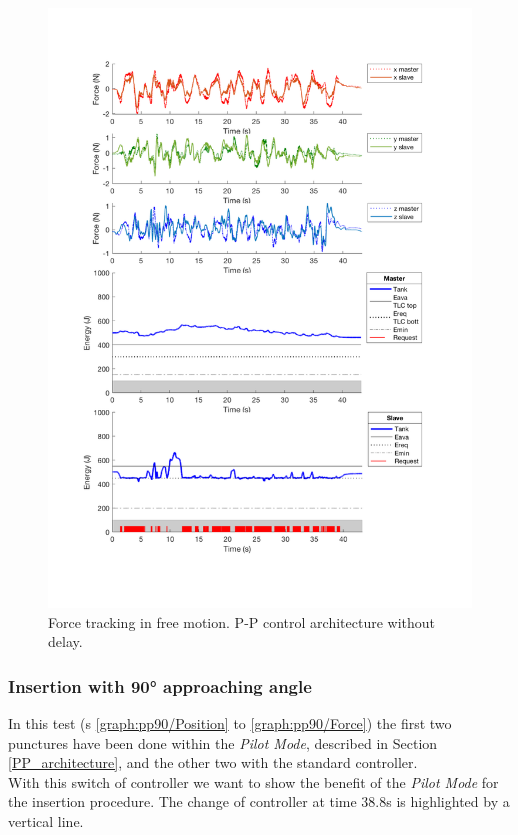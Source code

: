 \begin{center}
	\begin{figure}
	\includegraphics[width=\textwidth, keepaspectratio]{plots/ppFree/Force.pdf}
	\caption{Force tracking in free motion. P-P control architecture without delay.}
	\label{graph:ppFree/Force}
\end{figure}
\end{center}
\newpage
\subsubsection{Insertion with 90° approaching angle}\label{sec:insertion-with-90-approaching-angle1}
In this test  (\figurename s{ \ref{graph:pp90/Position} to \ref{graph:pp90/Force}}) the first two punctures have been done within the \textit{Pilot Mode}, described in Section \ref{PP_architecture}, and the other two with the standard controller.\\
With this switch of controller we want to show the benefit of the \textit{Pilot Mode} for the insertion procedure.
The change of controller at time 38.8s is highlighted by a vertical line.

